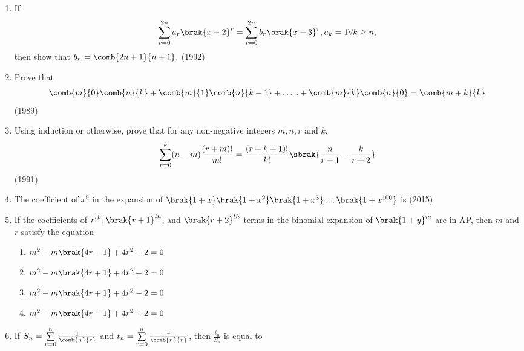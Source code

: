 \begin{enumerate}[label=\thesubsection.\arabic*,ref=\thesubsection.\theenumi]
 \item If $$ \sum\limits_{r=0}^{2n} a_r \brak{x-2}^r=\sum\limits_{r=0}^{2n}b_r \brak{x-3}^r,  a_k =1  \forall k \geq  n,$$ then show that $ b_n = \comb{2n+1}{n+1}.$ \hfill{(1992)}

 \item Prove that
		    \begin{align*} \comb{m}{0}\comb{n}{k} +\comb{m}{1}\comb{n}{k-1}+\dots..+\comb{m}{k}\comb{n}{0} =\comb{m+k}{k} \end{align*}  \hfill{(1989)}
 \item Using induction or otherwise, prove that for any non-negative integers $m,n,r$ and $ k$,
		    \begin{align*} 
			    \sum_{r=0}^{k}(n-m)\frac{(r+m)!}{m!}= \frac{(r+k+1)!}{k!}\sbrak{\frac{n}{r+1}-\frac{k}{r+2}}
		    \end{align*}
		     \hfill{(1991)} 
   \item The coefficient of $x^{9}$ in the expansion of $\brak{1+x}\brak{1+x^{2}}\brak{1+x^{3}} \dots \brak{1+x^{100}} $ is 
   \hfill(2015)
\item If the coefficients of $r^{th}, \brak{r+1}^{th}$, and $\brak{r+2}^{th}$ terms in the binomial expansion of $\brak{1+y}^m$ are in AP, then $m$ and $r$ satisfy the equation
{\hfill{}} 
\begin{multicols}{2}
\begin{enumerate}
\item  {$m^2-m\brak{4r-1}+4r^2-2=0$}
\item  {$m^2-m\brak{4r+1}+4r^2+2=0$}
\item  {$m^2-m\brak{4r+1}+4r^2-2=0$}
\item  {$m^2-m\brak{4r-1}+4r^2+2=0$}
\end{enumerate}
\end{multicols}
\item {If $S_n = \sum\limits_{r=0}^{n} \frac{1}{\comb{n}{r}}$ and $t_n = \sum\limits_{r=0}^{n} \frac{r}{\comb{n}{r}}$, then $\frac{t_n}{S_n}$ is equal to}
{\hfill{}} 
\begin{enumerate}
\end{enumerate}


\end{enumerate}

